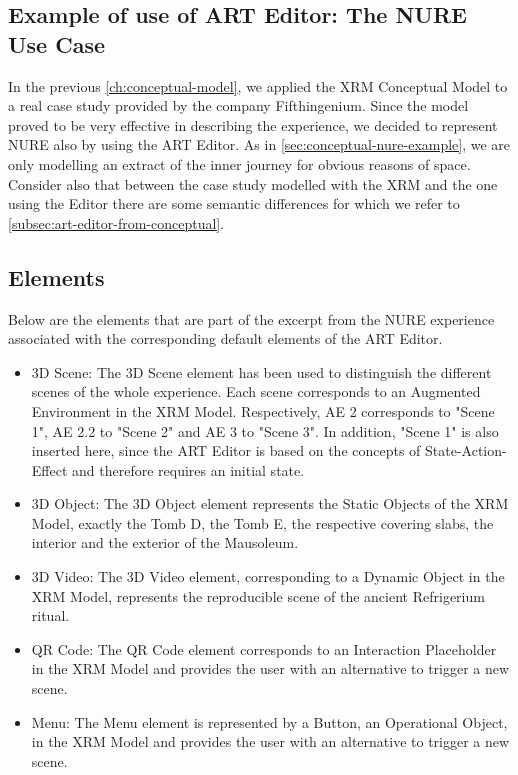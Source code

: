 \subsection{Example of use of ART Editor: The NURE Use Case}
\label{subsec:art-editor-nure-example}

In the previous \autoref{ch:conceptual-model}, we applied the XRM Conceptual Model to a real case study provided by the company Fifthingenium. Since the model proved to be very effective in describing the experience, we decided to represent NURE also by using the ART Editor. 
As in \autoref{sec:conceptual-nure-example}, we are only modelling an extract of the inner journey for obvious reasons of space. 
Consider also that between the case study modelled with the XRM and the one using the Editor there are some semantic differences for which we refer to \autoref{subsec:art-editor-from-conceptual}.

\subsection*{Elements}

Below are the elements that are part of the excerpt from the NURE experience associated with the corresponding default elements of the ART Editor.

\begin{itemize}
    \item 3D Scene: The 3D Scene element has been used to distinguish the different scenes of the whole experience. Each scene corresponds to an Augmented Environment in the XRM Model. Respectively, AE 2 corresponds to "Scene 1", AE 2.2 to "Scene 2" and AE 3 to "Scene 3". In addition, "Scene 1" is also inserted here, since the ART Editor is based on the concepts of State-Action-Effect and therefore requires an initial state.
    \item 3D Object: The 3D Object element represents the Static Objects of the XRM Model, exactly the Tomb D, the Tomb E, the respective covering slabs, the interior and the exterior of the Mausoleum.
    \item 3D Video: The 3D Video element, corresponding to a Dynamic Object in the XRM Model, represents the reproducible scene of the ancient Refrigerium ritual.
    \item QR Code: The QR Code element corresponds to an Interaction Placeholder in the XRM Model and provides the user with an alternative to trigger a new scene.
    \item Menu: The Menu element is represented by a Button, an Operational Object, in the XRM Model and provides the user with an alternative to trigger a new scene.
\end{itemize}

